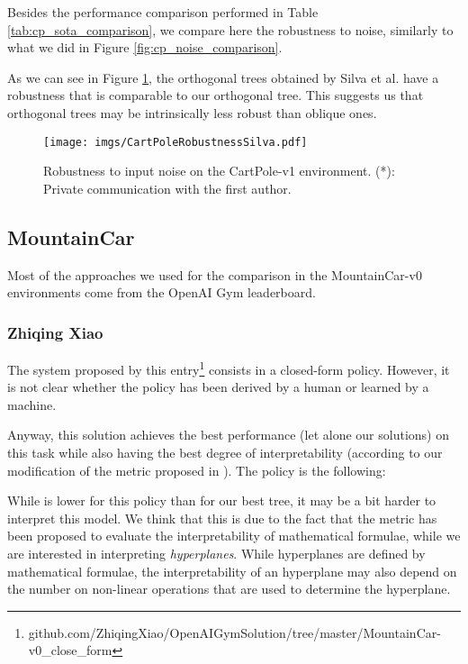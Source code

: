 \documentclass[review,english]{elsarticle}
\begin{document}
Besides the performance comparison performed in Table \ref{tab:cp_sota_comparison}, we compare here the robustness to noise, similarly to what we did in Figure \ref{fig:cp_noise_comparison}.

As we can see in Figure \ref{fig:cp_noise_sota_comparison}, the orthogonal trees obtained by Silva et al. have a robustness that is comparable to our orthogonal tree.
This suggests us that orthogonal trees may be intrinsically less robust than oblique ones.

\begin{figure}[!ht]
    \centering
    \texttt{[image: imgs/CartPoleRobustnessSilva.pdf]}
    \caption{Robustness to input noise on the CartPole-v1 environment.
    (*): Private communication with the first author.}
    \label{fig:cp_noise_sota_comparison}
\end{figure}

\subsection{MountainCar}
Most of the approaches we used for the comparison in the MountainCar-v0 environments come from the OpenAI Gym leaderboard.

\subsubsection{Zhiqing Xiao}
The system proposed by this entry\footnote{github.com/ZhiqingXiao/OpenAIGymSolution/tree/master/MountainCar-v0\_close\_form} consists in a closed-form policy. 
However, it is not clear whether the policy has been derived by a human or learned by a machine.

Anyway, this solution achieves the best performance (let alone our solutions) on this task while also having the best degree of interpretability (according to our modification of the metric proposed in \cite{virgolin_learning_2020}).
The policy is the following:





While  is lower for this policy than for our best tree, it may be a bit harder to interpret this model.
We think that this is due to the fact that the  metric has been proposed to evaluate the interpretability of mathematical formulae, while we are interested in interpreting \textit{hyperplanes}.
While hyperplanes are defined by mathematical formulae, the interpretability of an hyperplane may also depend on the number on non-linear operations that are used to determine the hyperplane.
\end{document}
